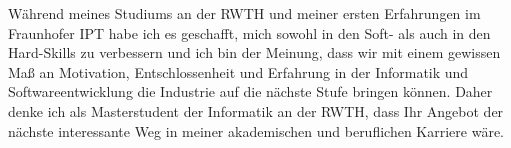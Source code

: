 Während meines Studiums an der RWTH und meiner ersten Erfahrungen im Fraunhofer IPT habe ich es geschafft, mich sowohl in den Soft- als auch in den Hard-Skills zu verbessern und ich bin der Meinung, dass wir mit einem gewissen Maß an Motivation, Entschlossenheit und Erfahrung in der Informatik und Softwareentwicklung die Industrie auf die nächste Stufe bringen können. Daher denke ich als Masterstudent der Informatik an der RWTH, dass Ihr Angebot der nächste interessante Weg in meiner akademischen und beruflichen Karriere wäre.


%
{\bfseries \firstname~\familyname}\\
%
\vfill%

